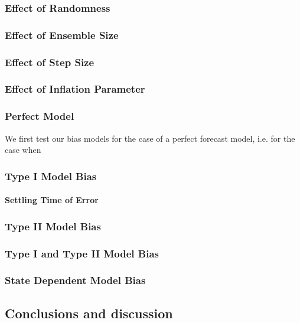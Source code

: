 \documentclass{article}
\begin{document}
\subsubsection{Effect of Randomness}

\subsubsection{Effect of Ensemble Size}
\subsubsection{Effect of Step Size}
\subsubsection{Effect of Inflation Parameter}
\subsubsection{Perfect Model}
We first test our bias models for the case of a perfect forecast model, i.e. for the case when 
\subsubsection{Type I Model Bias}
\paragraph{Settling Time of Error}
\paragraph{}
\subsubsection{Type II Model Bias}
\subsubsection{Type I and Type II Model Bias}
\subsubsection{State Dependent Model Bias}
\subsection{Conclusions and discussion}
\end{document}
